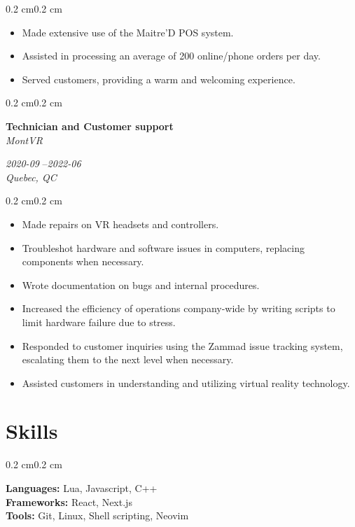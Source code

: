 \documentclass[10pt, letterpaper]{article}
\newenvironment{highlights}{%
    \begin{itemize}[
        topsep=0.10 cm,%
        parsep=0.10 cm,%
        partopsep=0pt,%
        itemsep=0pt,%
        leftmargin=0.4 cm + 10pt%
    ]
}{%
    \end{itemize}%
}
\newenvironment{onecolentry}{%
    \begin{adjustwidth}{0.2 cm}{0.2 cm}%
}{%
    \end{adjustwidth}%
}
\newenvironment{twocolentry}[1]{%
    \begin{onecolentry}%
    \def\twocolentryarg{#1}%
    \noindent
    \begin{minipage}[t]{0.68\textwidth} %
}{%
    \end{minipage}\hfill%
    \begin{minipage}[t]{0.30\textwidth} %
      \raggedleft\twocolentryarg
    \end{minipage}%
    \vspace{0.2cm}%
    \end{onecolentry}%
}
\begin{document}
\vspace{0.10 cm}
\begin{onecolentry}
    \begin{highlights}
        \item Made extensive use of the Maitre'D POS system.
        \item Assisted in processing an average of 200 online/phone orders per day.
        \item Served customers, providing a warm and welcoming experience.
    \end{highlights}
\end{onecolentry}
\vspace{0.2 cm}
\begin{twocolentry}{%
\textit{2020-09 }--\textit{2022-06} \\[0.1cm]
\textit{Quebec, QC}%
}
    \textbf{Technician and Customer support }\\
    \textit{MontVR }
\end{twocolentry}
\vspace{0.10 cm}
\begin{onecolentry}
    \begin{highlights}
        \item Made repairs on VR headsets and controllers.
        \item Troubleshot hardware and software issues in computers, replacing components when necessary.
        \item Wrote documentation on bugs and internal procedures.
        \item Increased the efficiency of operations company-wide by writing scripts to limit hardware failure due to stress.
        \item Responded to customer inquiries using the Zammad issue tracking system, escalating them to the next level when necessary.
        \item Assisted customers in understanding and utilizing virtual reality technology.
    \end{highlights}
\end{onecolentry}
\vspace{0.2 cm}


\section{Skills}
\begin{onecolentry}
    \textbf{Languages:} Lua, Javascript, C++\\
    \textbf{Frameworks:} React, Next.js\\
    \textbf{Tools:} Git, Linux, Shell scripting, Neovim\\
\end{onecolentry}
\end{document}

